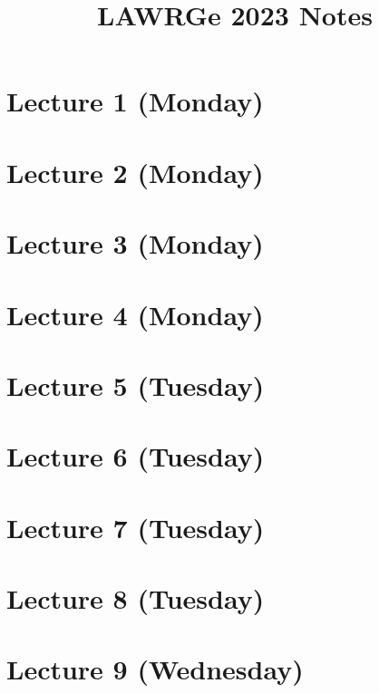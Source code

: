 \documentclass[12pt]{amsart}
\begin{document}
\title{LAWRGe 2023 Notes}


\maketitle

\setcounter{tocdepth}{1}

\tableofcontents


\section{Lecture 1 (Monday)}


\section{Lecture 2 (Monday)}


\section{Lecture 3 (Monday)}


\section{Lecture 4 (Monday)}


\section{Lecture 5 (Tuesday)}


\section{Lecture 6 (Tuesday)}


\section{Lecture 7 (Tuesday)}


\section{Lecture 8 (Tuesday)}


\section{Lecture 9 (Wednesday)}

\end{document}
